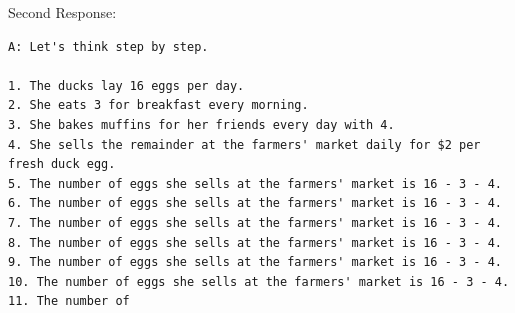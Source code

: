 \documentclass{article} %
\begin{document}
\vspace{10px}
Second Response:
\begin{lstlisting}
A: Let's think step by step.                                                                                                                                                                                                         
                                                                                                                                                                                                                                     
1. The ducks lay 16 eggs per day.                                                                                                                                                                                                    
2. She eats 3 for breakfast every morning.                                                                                                                                                                                           
3. She bakes muffins for her friends every day with 4.                                                                                                                                                                               
4. She sells the remainder at the farmers' market daily for $2 per fresh duck egg.                                                                                                                                                   
5. The number of eggs she sells at the farmers' market is 16 - 3 - 4.                                                                                                                                                                
6. The number of eggs she sells at the farmers' market is 16 - 3 - 4.                                                                                                                                                                
7. The number of eggs she sells at the farmers' market is 16 - 3 - 4.                                                                                                                                                                
8. The number of eggs she sells at the farmers' market is 16 - 3 - 4.                                                                                                                                                                
9. The number of eggs she sells at the farmers' market is 16 - 3 - 4.                                                                                                                                                                
10. The number of eggs she sells at the farmers' market is 16 - 3 - 4.                                                                                                                                                               
11. The number of                                                                                                                                                                                                         
\end{lstlisting}
\end{document}
